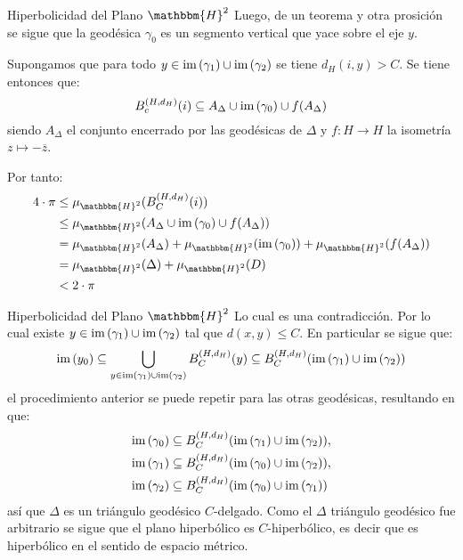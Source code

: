 \documentclass[xcolor=dvipsnames]{beamer}
\theoremstyle{largebreak}
\newcommand\cf[3]{\ensuremath{#1:#2\rightarrow#3}}
\newcommand{\bbm}[1]{\ensuremath{\mathbbm{#1}}}
\newcommand{\im}[1]{\ensuremath{\textup{im}\left(#1\right)}}
\begin{document}
\begin{frame}{Hiperbolicidad del Plano $\bbm{H}^2$}
    Luego, de un teorema y otra prosición se sigue que la geodésica $\gamma_0$ es un segmento vertical que yace sobre el eje $y$.

    Supongamos que para todo $y\in\im{\gamma_1}\cup\im{\gamma_2}$ se tiene $d_H(i,y)>C$. Se tiene entonces que:
    \begin{equation*}
        B_c^{(H,d_H)}(i)\subseteq A_\Delta\cup\im{\gamma_0}\cup f(A_\Delta)
    \end{equation*}
    siendo $A_\Delta$ el conjunto encerrado por las geodésicas de $\Delta$ y $\cf{f}{H}{H}$ la isometría $z\mapsto-\overline{z}$.


    Por tanto:
    \begin{equation*}
        \begin{split}
            4\cdot\pi&\leq\mu_{\bbm{H}^2}(B_C^{(H,d_H)}(i))\\
            &\leq\mu_{\bbm{H}^2}(A_\Delta\cup\im{\gamma_0}\cup f(A_\Delta))\\
            &=\mu_{\bbm{H}^2}(A_\Delta)+\mu_{\bbm{H}^2}(\im{\gamma_0})+\mu_{\bbm{H}^2}(f(A_\Delta))\\
            &=\mu_{\bbm{H}^2}(\Delta)+\mu_{\bbm{H}^2}(D)\\
            &< 2\cdot\pi\\
        \end{split}
    \end{equation*}
\end{frame}

\begin{frame}{Hiperbolicidad del Plano $\bbm{H}^2$}
    Lo cual es una contradicción. Por lo cual existe $y\in\im{\gamma_1}\cup\im{\gamma_2}$ tal que $d(x,y)\leq C$. En particular se sigue que:
    \begin{equation*}
        \im{y_0}\subseteq \bigcup_{y\in\im{\gamma_1}\cup\im{\gamma_2}}B_C^{(H,d_H)}(y)\subseteq B_C^{(H,d_H)}( \im{\gamma_1}\cup\im{\gamma_2} )
    \end{equation*}
    el procedimiento anterior se puede repetir para las otras geodésicas, resultando en que:
    \begin{equation*}
        \begin{split}
            \im{\gamma_0}&\subseteq B_{C}^{(H,d_H)}(\im{\gamma_1}\cup\im{\gamma_2}),\\
            \im{\gamma_1}&\subseteq B_{C}^{(H,d_H)}(\im{\gamma_0}\cup\im{\gamma_2}),\\
            \im{\gamma_2}&\subseteq B_{C}^{(H,d_H)}(\im{\gamma_0}\cup\im{\gamma_1})\\
        \end{split}
    \end{equation*}
    así que $\Delta$ es un triángulo geodésico $C$-delgado. Como el $\Delta$ triángulo geodésico fue arbitrario se sigue que el plano hiperbólico es $C$-hiperbólico, es decir que es hiperbólico en el sentido de espacio métrico.
\end{frame}
\end{document}
